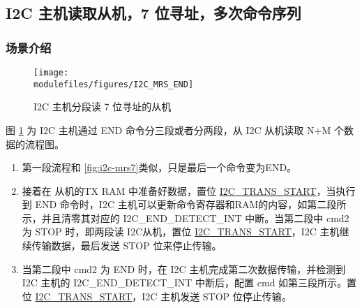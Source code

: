 \documentclass[main\_\_CN.tex]{subfiles}
\begin{document}
\subsection{I2C 主机读取从机，7 位寻址，多次命令序列}
\subsubsection{场景介绍}
\begin{figure}[H]
    \centering
    \texttt{[image: \\modulefiles/figures/I2C\_MRS\_END]}
    \caption{I2C 主机分段读 7 位寻址的从机}
    \label{fig:i2c-mrs7-multiple}
\end{figure}

图 \ref{fig:i2c-mrs7-multiple} 为 I2C 主机通过 END 命令分三段或者分两段，从 I2C 从机读取 N+M 个数据的流程图。
\begin{enumerate}
    \item 第一段流程和 \ref{fig:i2c-mrs7}类似，只是最后一个命令变为END。
    \item 接着在 从机的TX RAM 中准备好数据，置位 \hyperref[fielddesc:I2CTRANSSTART]{I2C\_TRANS\_START}，当执行到 END 命令时，I2C 主机可以更新命令寄存器和RAM的内容，如第二段所示，并且清零其对应的 I2C\_END\_DETECT\_INT 中断。当第二段中 cmd2 为 STOP 时，即两段读 I2C从机，置位 \hyperref[fielddesc:I2CTRANSSTART]{I2C\_TRANS\_START}，I2C 主机继续传输数据，最后发送 STOP 位来停止传输。
    \item 当第二段中 cmd2 为 END 时，在 I2C 主机完成第二次数据传输，并检测到 I2C 主机的 I2C\_END\_DETECT\_INT 中断后，配置 cmd 如第三段所示。置位 \hyperref[fielddesc:I2CTRANSSTART]{I2C\_TRANS\_START}，I2C 主机发送 STOP 位停止传输。
\end{enumerate}
\end{document}
